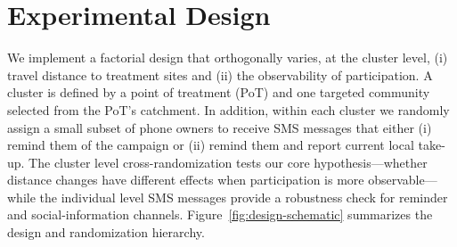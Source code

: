 \documentclass[12pt,a4paper]{article}
\begin{document}
\section{Experimental Design} \label{design}

We implement a factorial design that orthogonally varies, at the cluster level, (i) travel distance to treatment sites and (ii) the observability of participation. A cluster is defined by a point of treatment (PoT) and one targeted community selected from the PoT's catchment. In addition, within each cluster we randomly assign a small subset of phone owners to receive SMS messages that either (i) remind them of the campaign or (ii) remind them and report current local take-up. The cluster level cross-randomization tests our core hypothesis---whether distance changes have different effects when participation is more observable---while the
individual level SMS messages provide a robustness check for reminder and social-information channels. Figure~\ref{fig:design-schematic} summarizes the design and randomization hierarchy.
\end{document}

